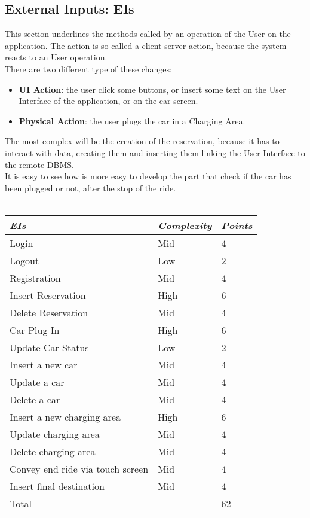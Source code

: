 \documentclass[11pt,a4paper]{report}
\begin{document}
\subsection{External Inputs: EIs}
This section underlines the methods called by an operation of the User on the application. The action is so called a client-server action, because the system reacts to an User operation.\\
There are two different type of these changes:
\begin{itemize}
	\item \textbf{UI Action}: the user click some buttons, or insert some text on the User Interface of the application, or on the car screen.
	\item \textbf{Physical Action}: the user plugs the car in a Charging Area.
\end{itemize}
The most complex will be the creation of the reservation, because it has to interact with data, creating them and inserting them linking the User Interface to the remote DBMS.\\It is easy to see how is more easy to develop the part that check if the car has been plugged or not, after the stop of the ride.\\\\
\begin{tabularx}{\textwidth}{|X|X|X|}
	\hline
	\textit{EIs} & \textit{Complexity} & \textit{Points}\\
	\hline
	Login & Mid & 4\\
	Logout & Low & 2 \\
	Registration & Mid & 4\\
	Insert Reservation & High & 6\\
	Delete Reservation & Mid & 4\\
	Car Plug In & High & 6\\
	Update Car Status & Low & 2\\
	Insert a new car & Mid & 4 \\
	Update a car & Mid & 4\\
	Delete a car & Mid & 4\\
	Insert a new charging area & High & 6\\
	Update charging area & Mid & 4\\
	Delete charging area & Mid & 4\\
	Convey end ride via touch screen & Mid & 4 \\ 
	Insert final destination & Mid & 4\\
	\hline
	\hline
	Total & \multicolumn{1}{X}{} & \multicolumn{1}{X|}{62}\\
	\hline
\end{tabularx}
\end{document}
